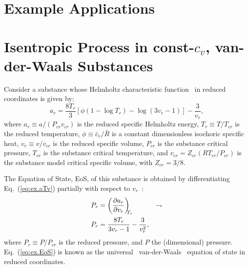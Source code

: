 \section{Example Applications}

    \section{Isentropic Process in const-$c_v$, van-der-Waals Substances}

    Consider         a         substance         whose         Helmholtz          characteristic
    function~\cite{1986-JonesJB+HawkinsGA-Wiley} in reduced coordinates is given by:
    \begin{equation}
        a_r = \frac{8T_r}{3}\left[
                  \phi\left(1 - \log T_r\right) - \log(3v_r - 1)
              \right] - \frac{3}{v_r},
        \label{eq:ex.aTv}
    \end{equation}
    \noindent where $a_r \equiv a / (P_{cr}v_{cr})$ is the reduced  specific  Helmholtz  energy,
    $T_r \equiv T / T_{cr}$ is the reduced temperature, $\phi \equiv \bar{c}_v / \bar{R}$  is  a
    constant dimensionless isochoric specific heat, $v_r \equiv  v  /  v_{cr}$  is  the  reduced
    specific volume, $P_{cr}$ is the substance critical  pressure,  $T_{cr}$  is  the  substance
    critical temperature, and $v_{cr} = Z_{cr}(RT_{cr}/P_{cr})$ is the substance model  critical
    specific volume, with $Z_{cr} = 3/8$.

    The  Equation  of  State,  EoS,  of  this   substance   is   obtained   by   differentiating
    Eq.~(\ref{eq:ex.aTv}) partially with respect to $v_r$~\cite{1986-JonesJB+HawkinsGA-Wiley}:
    \begin{align}
        P_r & = \left(\frac{\partial {{a_r}}}{\partial {{v_r}}}\right)_{\!\!\!{T_r}} & \rightharpoondown\\
        P_r & = \frac{8T_r}{3v_r - 1} - \frac{3}{v_r^2}, \label{eq:ex.EoS}
    \end{align}
    \noindent where $P_r \equiv P / P_{cr}$ is the reduced pressure, and $P$  the  (dimensional)
    pressure. Eq.~(\ref{eq:ex.EoS}) is  known  as  the  universal~\cite{1899-MaxwellJC-Longmans}
    van-der-Waals~\cite{2006-BejanA-Wiley,                           2013-CengelYA+BolesMA-AMGH,
    1986-JonesJB+HawkinsGA-Wiley} equation of state in reduced coordinates.

